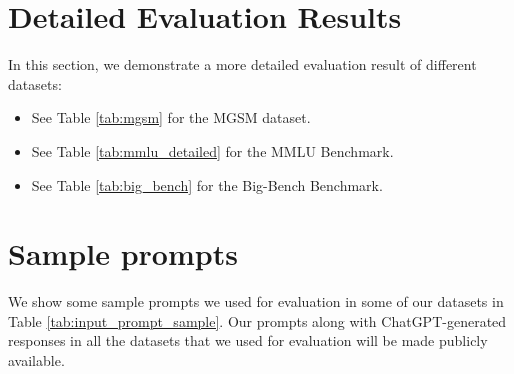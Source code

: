 \documentclass[11pt]{article}
\begin{document}
\section{Detailed Evaluation Results}
\label{appendix:detailed_results}

In this section, we demonstrate a more detailed evaluation result of different datasets:

\begin{itemize}
    \item See Table \ref{tab:mgsm} for the MGSM dataset.
    \item See Table \ref{tab:mmlu_detailed} for the MMLU Benchmark.
    \item See Table \ref{tab:big_bench} for the Big-Bench Benchmark.
\end{itemize}

\section{Sample prompts}
\label{appendix:inputprompt}

We show some sample prompts we used for evaluation in some of our datasets in Table \ref{tab:input_prompt_sample}. Our prompts along with ChatGPT-generated responses in all the datasets that we used for evaluation will be made publicly available.
\end{document}
